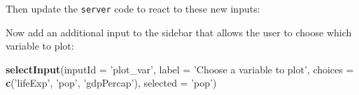 \documentclass[]{book}
\newenvironment{Shaded}{\begin{snugshade}}{\end{snugshade}}
\newcommand{\DataTypeTok}[1]{\textcolor[rgb]{0.13,0.29,0.53}{#1}}
\newcommand{\KeywordTok}[1]{\textcolor[rgb]{0.13,0.29,0.53}{\textbf{#1}}}
\newcommand{\NormalTok}[1]{#1}
\newcommand{\OperatorTok}[1]{\textcolor[rgb]{0.81,0.36,0.00}{\textbf{#1}}}
\newcommand{\StringTok}[1]{\textcolor[rgb]{0.31,0.60,0.02}{#1}}
\begin{document}
Then update the \texttt{server} code to react to these new inputs:

\begin{Shaded}
\end{Shaded}

Now add an additional input to the sidebar that allows the user to choose which variable to plot:

\begin{Shaded}
\begin{Highlighting}[]
\KeywordTok{selectInput}\NormalTok{(}\DataTypeTok{inputId =} \StringTok{'plot_var'}\NormalTok{,}
            \DataTypeTok{label =} \StringTok{'Choose a variable to plot'}\NormalTok{,}
            \DataTypeTok{choices =} \KeywordTok{c}\NormalTok{(}\StringTok{'lifeExp'}\NormalTok{, }\StringTok{'pop'}\NormalTok{, }\StringTok{'gdpPercap'}\NormalTok{),}
            \DataTypeTok{selected =} \StringTok{'pop'}\NormalTok{)}
\end{Highlighting}
\end{Shaded}
\end{document}
